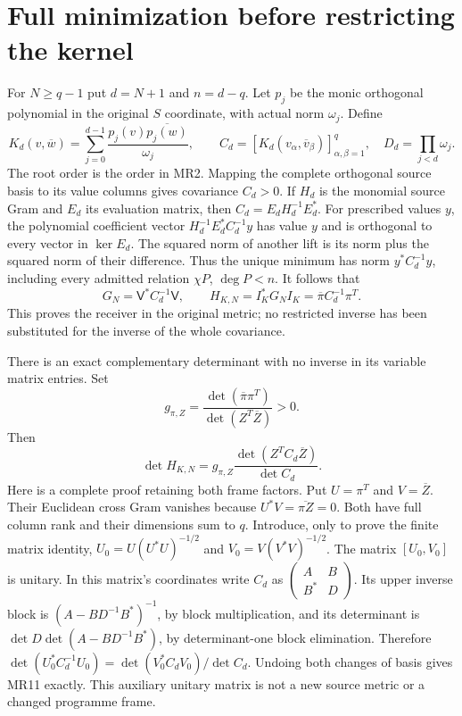 \documentclass[11pt]{article}
\begin{document}
\section{Full minimization before restricting the kernel}
For $N\ge q-1$ put $d=N+1$ and $n=d-q$. Let $p_j$ be the monic
orthogonal polynomial in the original $S$ coordinate, with actual norm
$\omega_j$. Define
\[
 K_d(v,\overline w)=\sum_{j=0}^{d-1}
       \frac{p_j(v)\overline{p_j(w)}}{\omega_j},
 \qquad C_d=[K_d(v_\alpha,\overline v_\beta)]_{\alpha,\beta=1}^q,
 \quad D_d=\prod_{j<d}\omega_j.\tag{MR9}
\]
The root order is the order in MR2. Mapping the complete orthogonal
source basis to its value columns gives covariance $C_d>0$.
If $H_d$ is the monomial source Gram and $E_d$ its evaluation matrix,
then $C_d=E_dH_d^{-1}E_d^*$. For prescribed values $y$, the polynomial
coefficient vector $H_d^{-1}E_d^*C_d^{-1}y$ has value $y$ and is
orthogonal to every vector in $\ker E_d$. The squared norm of another
lift is its norm plus the squared norm of their difference. Thus the
unique minimum has norm $y^*C_d^{-1}y$, including every admitted
relation $\chi P$, $\deg P<n$. It follows that
\[
 G_N=\mathsf V^*C_d^{-1}\mathsf V,
 \qquad H_{K,N}=I_K^*G_NI_K
           =\overline\pi C_d^{-1}\pi^T.\tag{MR10}
\]
This proves the receiver in the original metric; no restricted inverse
has been substituted for the inverse of the whole covariance.

There is an exact complementary determinant with no inverse in its
variable matrix entries. Set
\[
 g_{\pi,Z}=
 \frac{\det(\overline\pi\pi^T)}{\det(Z^T\overline Z)}>0.
\]
Then
\[
 \boxed{\det H_{K,N}
     =g_{\pi,Z}\frac{\det(Z^TC_d\overline Z)}{\det C_d}.}
 \tag{MR11}
\]
Here is a complete proof retaining both frame factors. Put
$U=\pi^T$ and $V=\overline Z$. Their Euclidean cross Gram vanishes
because $U^*V=\overline{\pi Z}=0$. Both have full column rank and
their dimensions sum to $q$. Introduce, only to prove the finite
matrix identity, $U_0=U(U^*U)^{-1/2}$ and
$V_0=V(V^*V)^{-1/2}$. The matrix $[U_0,V_0]$ is unitary.
In this matrix's coordinates write $C_d$ as
$\left(\begin{smallmatrix}A&B\\B^*&D\end{smallmatrix}\right)$.
Its upper inverse block is $(A-BD^{-1}B^*)^{-1}$, by block
multiplication, and its determinant is
$\det D\det(A-BD^{-1}B^*)$, by determinant-one block elimination.
Therefore $\det(U_0^*C_d^{-1}U_0)=\det(V_0^*C_dV_0)/\det C_d$.
Undoing both changes of basis gives MR11 exactly. This auxiliary
unitary matrix is not a new source metric or a changed programme frame.
\end{document}
